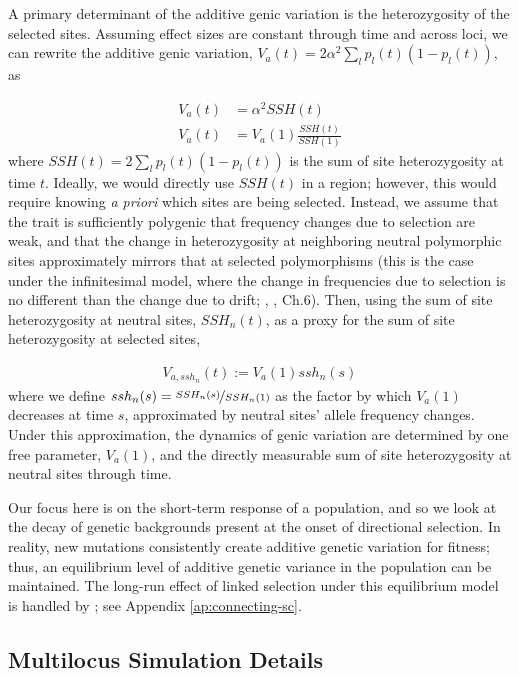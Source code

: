 \documentclass[11pt]{article}
\begin{document}
A primary determinant of the additive genic variation is the heterozygosity of
the selected sites. Assuming effect sizes are constant through time and across
loci, we can rewrite the additive genic variation, $V_a(t) = 2 \alpha^2 \sum_l
p_l(t) (1-p_l(t))$, as

\begin{align}
  \label{eq:VA-SSH}
  V_a(t) &= \alpha^2 SSH(t) \\
  V_a(t) &= V_a(1) \frac{SSH(t)}{SSH(1)}
\end{align}
%
where $SSH(t) = 2 \sum_l p_l(t) (1-p_l(t))$ is the sum of site heterozygosity
at time $t$.  Ideally, we would directly use $SSH(t)$ in a region; however,
this would require knowing \emph{a priori} which sites are being selected.
Instead, we assume that the trait is sufficiently polygenic that frequency
changes due to selection are weak, and that the change in heterozygosity at
neighboring neutral polymorphic sites approximately mirrors that at selected
polymorphisms (this is the case under the infinitesimal model, where the
change in frequencies due to selection is no different than the change due to
drift; \cite{Bulmer1980-zo,Robertson1960-jz}, \cite{Kimura1984-ia}, Ch.6).
Then, using the sum of site heterozygosity at neutral sites, $SSH_n(t)$, as a
proxy for the sum of site heterozygosity at selected sites, 

\begin{align}
  V_{a,ssh_n}(t) := V_a(1) ssh_n(s)
  \label{eq:VA-ssh}
\end{align}
%
where we define $ssh_n(s) = \nicefrac{SSH_n(s)}{SSH_n(1)}$ as the factor by
which $V_a(1)$ decreases at time $s$, approximated by neutral sites' allele
frequency changes. Under this approximation, the dynamics of genic variation
are determined by one free parameter, $V_a(1)$, and the directly measurable sum of
site heterozygosity at neutral sites through time. 

Our focus here is on the short-term response of a population, and so we look at
the decay of genetic backgrounds present at the onset of directional selection.
In reality, new mutations consistently create additive genetic variation for
fitness; thus, an equilibrium level of additive genetic variance in the
population can be maintained. The long-run effect of linked selection under
this equilibrium model is handled by
\textcite{Santiago1995-hx,Santiago1998-bs}; see Appendix
\ref{ap:connecting-sc}.

\subsection{Multilocus Simulation Details}
\label{sec:ml-sim}
\end{document}
